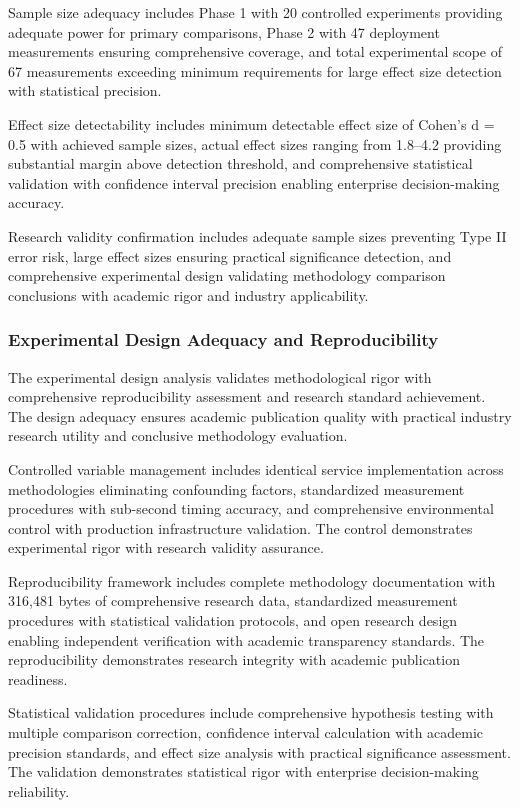 Sample size adequacy includes Phase 1 with 20 controlled experiments providing adequate power for primary comparisons, Phase 2 with 47 deployment measurements ensuring comprehensive coverage, and total experimental scope of 67 measurements exceeding minimum requirements for large effect size detection with statistical precision.

Effect size detectability includes minimum detectable effect size of Cohen's d = 0.5 with achieved sample sizes, actual effect sizes ranging from 1.8--4.2 providing substantial margin above detection threshold, and comprehensive statistical validation with confidence interval precision enabling enterprise decision-making accuracy.

Research validity confirmation includes adequate sample sizes preventing Type II error risk, large effect sizes ensuring practical significance detection, and comprehensive experimental design validating methodology comparison conclusions with academic rigor and industry applicability.

\subsubsection{Experimental Design Adequacy and Reproducibility}

The experimental design analysis validates methodological rigor with comprehensive reproducibility assessment and research standard achievement. The design adequacy ensures academic publication quality with practical industry research utility and conclusive methodology evaluation.

Controlled variable management includes identical service implementation across methodologies eliminating confounding factors, standardized measurement procedures with sub-second timing accuracy, and comprehensive environmental control with production infrastructure validation. The control demonstrates experimental rigor with research validity assurance.

Reproducibility framework includes complete methodology documentation with 316,481 bytes of comprehensive research data, standardized measurement procedures with statistical validation protocols, and open research design enabling independent verification with academic transparency standards. The reproducibility demonstrates research integrity with academic publication readiness.

Statistical validation procedures include comprehensive hypothesis testing with multiple comparison correction, confidence interval calculation with academic precision standards, and effect size analysis with practical significance assessment. The validation demonstrates statistical rigor with enterprise decision-making reliability.

